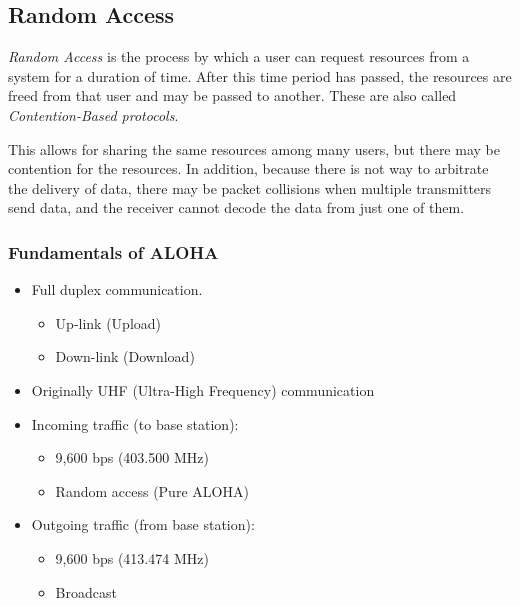 \subsection{Random Access}\label{subsec:Random_Access}
\begin{definition}\label{def:Random_Access}
  \emph{Random Access} is the process by which a user can request resources from a system for a duration of time.
  After this time period has passed, the resources are freed from that user and may be passed to another.
  These are also called \emph{Contention-Based protocols}.

  This allows for sharing the same resources among many users, but there may be contention for the resources.
  In addition, because there is not way to arbitrate the delivery of data, there may be packet collisions when multiple transmitters send data, and the receiver cannot decode the data from just one of them.
\end{definition}

\subsubsection{Fundamentals of ALOHA}\label{subsubsec:ALOHA_Fundamentals}
\begin{itemize}[noitemsep]
\item Full duplex communication.
  \begin{itemize}[noitemsep]
  \item Up-link (Upload)
  \item Down-link (Download)
  \end{itemize}

\item Originally UHF (Ultra-High Frequency) communication
\item Incoming traffic (to base station):
  \begin{itemize}[noitemsep]
  \item 9,600 bps (403.500 MHz)
  \item Random access (Pure ALOHA)
  \end{itemize}
\item Outgoing traffic (from base station):
  \begin{itemize}[noitemsep]
  \item 9,600 bps (413.474 MHz)
  \item Broadcast
  \end{itemize}
\end{itemize}

